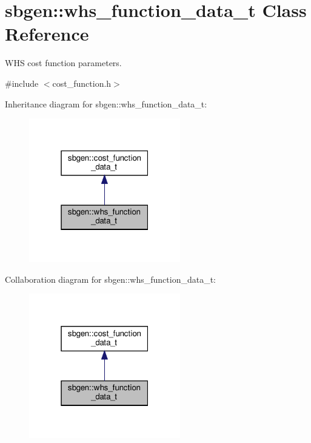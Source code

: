 \hypertarget{classsbgen_1_1whs__function__data__t}{}\section{sbgen\+:\+:whs\+\_\+function\+\_\+data\+\_\+t Class Reference}
\label{classsbgen_1_1whs__function__data__t}


W\+HS cost function parameters.  




{\ttfamily \#include $<$cost\+\_\+function.\+h$>$}



Inheritance diagram for sbgen\+:\+:whs\+\_\+function\+\_\+data\+\_\+t\+:
\nopagebreak
\begin{figure}[H]
\begin{center}
\leavevmode
\includegraphics[width=187pt]{classsbgen_1_1whs__function__data__t__inherit__graph}
\end{center}
\end{figure}


Collaboration diagram for sbgen\+:\+:whs\+\_\+function\+\_\+data\+\_\+t\+:
\nopagebreak
\begin{figure}[H]
\begin{center}
\leavevmode
\includegraphics[width=187pt]{classsbgen_1_1whs__function__data__t__coll__graph}
\end{center}
\end{figure}
